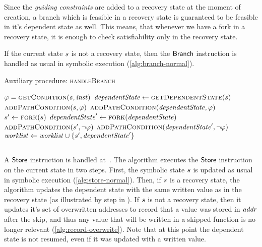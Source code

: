 Since the \textit{guiding constraints} are added to a recovery state at the moment of creation,
a branch which is feasible in a recovery state is guaranteed to be feasible in it's dependent state as well.
This means, that whenever we have a fork in a recovery state,
it is enough to check satisfiability only in the recovery state.

If the current state $s$ is not a recovery
state, then the $\mathsf{Branch}$ instruction is handled as usual in
symbolic execution (\cref{alg:branch-normal}).

\begin{algorithm}
  \caption{Auxiliary procedure: \textsc{handleBranch}
  \label{fig:aux-handle-branch}}
\begin{algorithmic}[1]

 \label{alg:branch-check-recovery}
  \State $\varphi = \Call{getCondition}{\workstate, \inst}$  \label{alg:branch-get-cond}
  \State $\dependentState \gets  \Call{getDependentState}{\workstate}$ \label{alg:get-dependent}
   \label{alg:branch-feasible-true}
    \State $\Call{addPathCondition}{\workstate, \varphi}$ \label{alg:add-pc-true-recS}
    \State $\Call{addPathCondition}{\dependentState, \varphi}$ \label{alg:add-pc-true-depS}
  \EndIf
   \label{alg:branch-feasible-false}
    \State $\workstate' \gets \Call{fork}{\workstate}$ \label{alg:branch-fork-false1}
    \State $\dependentState' \gets \Call{fork}{\dependentState}$ \label{alg:branch-fork-false2}
    \State $\Call{addPathCondition}{\workstate', \neg \varphi}$ \label{alg:add-pc-false-recS}
    \State $\Call{addPathCondition}{\dependentState', \neg \varphi}$ \label{alg:add-pc-false-depS}
    \State $\mathit{worklist} \gets \mathit{worklist} \cup \{s', \mathit{dependentState}'\}$ \label{alg:push-both}
  \EndIf
\Else
  \State {}  \label{alg:branch-normal}
\EndIf
\EndFunction
\end{algorithmic}
\end{algorithm}

\subsection{}
A $\mathsf{Store}$ instruction is handled at~.
The algorithm executes the $\mathsf{Store}$ instruction on the
current state in two steps.
First, the symbolic state $s$ is updated as usual in symbolic execution (\cref{alg:store-normal}).
Then, if $s$ is a recovery state, the algorithm
updates the dependent state with the same written value as in the recovery state
(as illustrated by step  in ).
If $s$ is not a recovery state,
then it updates it's set of overwritten addresses to record
that a value was stored in $\mathit{addr}$ after the skip,
and thus any value that will be written in a skipped function
is no longer relevant (\cref{alg:record-overwrite}). 
Note that at this point the dependent state is not resumed,
even if it was updated with a written value.

